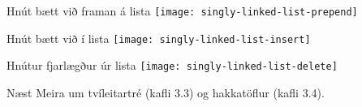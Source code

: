 \documentclass[handout]{beamer}
\begin{document}
\begin{frame}[fragile]{Hnút bætt við framan á lista}
	\texttt{[image: singly-linked-list-prepend]}
\end{frame}

\begin{frame}[fragile]{Hnút bætt við í lista}
	\texttt{[image: singly-linked-list-insert]}
\end{frame}

\begin{frame}[fragile]{Hnútur fjarlægður úr lista}
	\texttt{[image: singly-linked-list-delete]}
\end{frame}

\begin{frame}{Næst}
	Meira um tvíleitartré (kafli 3.3) og hakkatöflur (kafli 3.4).
\end{frame}
\end{document}
